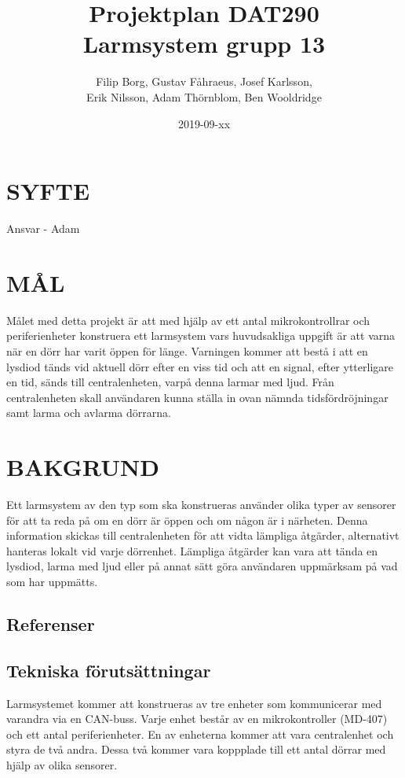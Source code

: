 \documentclass[a4paper]{article}
\title{Projektplan DAT290 \\ \Large Larmsystem grupp 13}
\author{Filip Borg, Gustav Fåhraeus, Josef Karlsson,\\
            Erik Nilsson, Adam Thörnblom, Ben Wooldridge}
\date{2019-09-xx}
\begin{document}
\maketitle
{}
\newpage

\tableofcontents
\newpage



\section{SYFTE}
\label{sec:syfte}

Ansvar - Adam

\section{MÅL}
\label{sec:mål}

Målet med detta projekt är att med hjälp av ett antal mikrokontrollrar och periferienheter konstruera ett larmsystem vars huvudsakliga uppgift är att varna när en dörr har varit öppen för länge. Varningen kommer att bestå i att en lysdiod tänds vid aktuell dörr efter en viss tid och att en signal, efter ytterligare en tid, sänds till centralenheten, varpå denna larmar med ljud. Från centralenheten skall användaren kunna ställa in ovan nämnda tidsfördröjningar samt larma och avlarma dörrarna.

\section{BAKGRUND}
\label{sec:bakgrund}

Ett larmsystem av den typ som ska konstrueras använder olika typer av sensorer för att ta reda på om en dörr är öppen och om någon är i närheten. Denna information skickas till centralenheten för att vidta lämpliga åtgärder, alternativt hanteras lokalt vid varje dörrenhet.
Lämpliga åtgärder kan vara att tända en lysdiod, larma med ljud eller på annat sätt göra användaren uppmärksam på vad som har uppmätts.

\subsection{Referenser}
\label{sec:referenser}



\subsection{Tekniska förutsättningar}
\label{sec:tekniskaf}
Larmsystemet kommer att konstrueras av tre enheter som kommunicerar med varandra via en CAN-buss. Varje enhet består av en mikrokontroller (MD-407) och ett antal periferienheter. En av enheterna kommer att vara centralenhet och styra de två andra. Dessa två kommer vara koppplade till ett antal dörrar med hjälp av olika sensorer.
\end{document}
